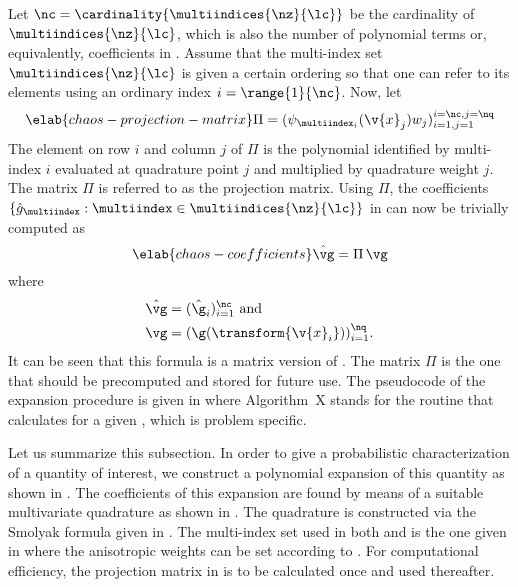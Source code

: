 Let $\nc = \cardinality{\multiindices{\nz}{\lc}}$ be the cardinality of
$\multiindices{\nz}{\lc}$, which is also the number of polynomial terms or,
equivalently, coefficients in . Assume that the
multi-index set $\multiindices{\nz}{\lc}$ is given a certain ordering so that
one can refer to its elements using an ordinary index $i = \range{1}{\nc}$. Now,
let
\begin{equation} \elab{chaos-projection-matrix}
  \Pi = (\psi_{\multiindex_i}(\v{x}_j) w_j)_{i = 1, j = 1}^{i = \nc, j = \nq}
\end{equation}
The element on row $i$ and column $j$ of $\Pi$ is the polynomial identified by
multi-index $i$ evaluated at quadrature point $j$ and multiplied by quadrature
weight $j$. The matrix $\Pi$ is referred to as the projection matrix. Using
$\Pi$, the coefficients $\{ \hat{g}_{\multiindex}: \multiindex \in
\multiindices{\nz}{\lc} \}$ in  can now be trivially
computed as
\begin{equation} \elab{chaos-coefficients}
  \hat{\vg} = \Pi \, \vg
\end{equation}
where
\begin{align*}
  & \hat{\vg} = (\hat{\g}_i)_{i = 1}^\nc \text{ and} \\
  & \vg = (\g(\transform{\v{x}_i}))_{i = 1}^\nq.
\end{align*}
It can be seen that this formula is a matrix version of
. The matrix $\Pi$ is the one that should be precomputed
and stored for future use. The pseudocode of the expansion procedure is given in
 where Algorithm~X stands for the routine that calculates
\g for a given \vu, which is problem specific.

Let us summarize this subsection. In order to give a probabilistic
characterization of a quantity of interest, we construct a polynomial expansion
of this quantity as shown in . The coefficients of this
expansion are found by means of a suitable multivariate quadrature as shown in
. The quadrature is constructed via the Smolyak formula
given in . The multi-index set used in both
 and  is the one given in
 where the anisotropic weights can be set
according to . For computational efficiency, the
projection matrix in  is to be calculated once and
used thereafter.

